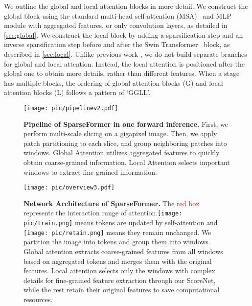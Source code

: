 We outline the global and local attention blocks in more detail. 
We construct the global block using the standard multi-head self-attention (MSA)~\cite{vaswani2017attention} and MLP module with aggregated features, or only convolution layers, as detailed in \cref{sec:global}. We construct the local block by adding a sparsification step and an inverse sparsification step before and after the Swin Transformer~\cite{liu2021swin} block, as described in \cref{sec:local}. Unlike previous work \cite{yang2021focalglobal, wang2021pnp}, we do not build separate branches for global and local attention. Instead, the local attention is positioned after the global one to obtain more details, rather than different features. When a stage has multiple blocks, the ordering of global attention blocks (G) and local attention blocks (L) follows a pattern of `GGLL'.

\begin{figure}[!]
\centering
		\texttt{[image: pic/pipelinev2.pdf]}
	\vspace{-20pt}
        \caption{\textbf{Pipeline of SparseFormer in one forward inference.} First, we perform multi-scale slicing on a gigapixel image. Then, we apply patch partitioning to each slice, and group neighboring patches into windows. Global Attention utilizes aggregated features to quickly obtain coarse-grained information. Local Attention selects important windows to extract fine-grained information.}
    \vspace{-12pt}
	\label{fig:pipeline}	
\end{figure}

\begin{figure*}[!]
\centering
		\texttt{[image: pic/overview3.pdf]}
         \vspace{-18pt}
	\caption{\textbf{Network Architecture of SparseFormer.} 
 The \textcolor{red}{red box} represents the interaction range of attention.\texttt{[image: pic/train.png]} means tokens are updated by self-attention and \texttt{[image: pic/retain.png]} means they remain unchanged.  We partition the image into tokens and group them into windows. Global attention extracts coarse-grained features from all windows based on aggregated tokens and merges them with the original features. Local attention selects only the windows with complex details for fine-grained feature extraction through our ScoreNet, while the rest retain their original features to save computational resources.
}
         \vspace{-6pt}
	\label{fig:overall}	
\end{figure*}



